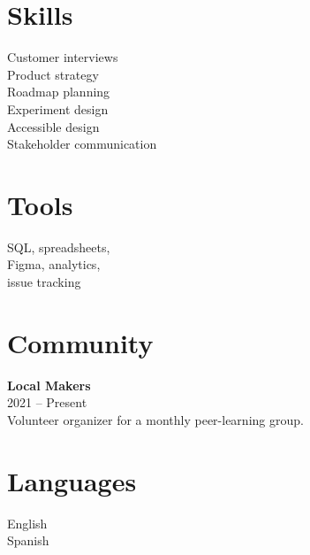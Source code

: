 \documentclass[10pt,a4paper]{article}
\begin{document}
\begin{minipage}[t]{0.29\textwidth}
\setlength{\parskip}{5pt}
\vspace{0pt}
\section{Skills}
Customer interviews\\
Product strategy\\
Roadmap planning\\
Experiment design\\
Accessible design\\
Stakeholder communication

\section{Tools}
SQL, spreadsheets,\\
Figma, analytics,\\
issue tracking

\section{Community}
\textbf{Local Makers}\\
2021 -- Present\\
Volunteer organizer for a monthly peer-learning group.

\section{Languages}
English\\
Spanish
\end{minipage}
\end{document}
